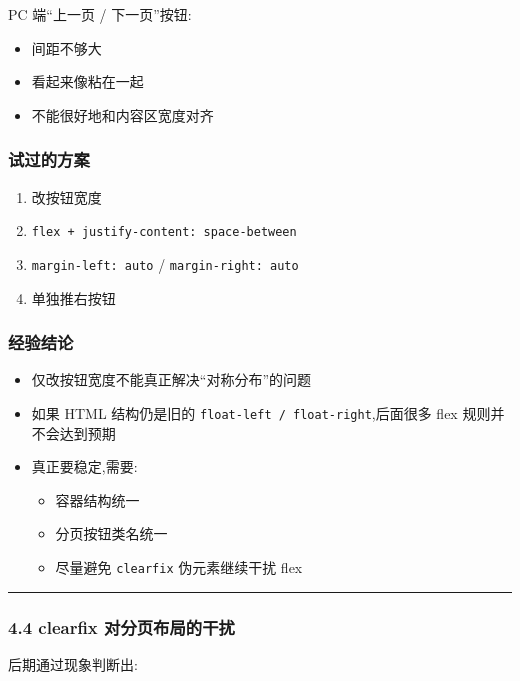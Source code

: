 \documentclass[lang=cn,scheme=chinese,color=blue,device=normal,toc=onecol,math=cm]{elegantbook}
\begin{document}
PC 端“上一页 /\allowbreak{} 下一页”按钮:\par


\begin{itemize}
\item 间距不够大
\item 看起来像粘在一起
\item 不能很好地和内容区宽度对齐
\end{itemize}


\subsubsection{试过的方案}


\begin{enumerate}
\item 改按钮宽度
\item \texttt{flex + justify-content: space-between}
\item \texttt{margin-left: auto} /\allowbreak{} \texttt{margin-right: auto}
\item 单独推右按钮
\end{enumerate}


\subsubsection{经验结论}


\begin{itemize}
\item 仅改按钮宽度不能真正解决“对称分布”的问题
\item 如果 HTML 结构仍是旧的 \texttt{float-left /\allowbreak{} float-right},后面很多 flex 规则并不会达到预期
\item 真正要稳定,需要: 
\begin{itemize}
\item 容器结构统一
\item 分页按钮类名统一
\item 尽量避免 \texttt{clearfix} 伪元素继续干扰 flex
\end{itemize}
\end{itemize}


\medskip\hrule\medskip


\subsubsection{4.4 clearfix 对分页布局的干扰}


后期通过现象判断出:\par
\end{document}
